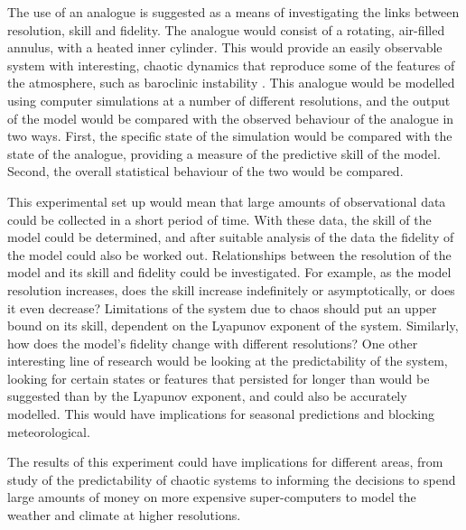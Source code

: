 \documentclass[12pt,a4paper]{article}
\begin{document}
The use of an analogue is suggested as a means of investigating the links between resolution, skill
and fidelity. The analogue would consist of a rotating, air-filled annulus, with a heated inner
cylinder. This would provide an easily observable system with interesting, chaotic dynamics that
reproduce some of the features of the atmosphere, such as baroclinic instability
\cite{castrejon2007baroclinic}. This analogue would be modelled using computer simulations at a
number of different resolutions, and the output of the model would be compared with the observed
behaviour of the analogue in two ways. First, the specific state of the simulation would be compared
with the state of the analogue, providing a measure of the predictive skill of the model. Second,
the overall statistical behaviour of the two would be compared.

This experimental set up would mean that large amounts of observational data could be collected in a
short period of time. With these data, the skill of the model could be determined, and after
suitable analysis of the data the fidelity of the model could also be worked out. Relationships
between the resolution of the model and its skill and fidelity could be investigated. For example,
as the model resolution increases, does the skill increase indefinitely or asymptotically, or does
it even decrease? Limitations of the system due to chaos should put an upper bound on its skill,
dependent on the Lyapunov exponent of the system. Similarly, how does the model's fidelity change
with different resolutions? One other interesting line of research would be looking at the
predictability of the system, looking for certain states or features that persisted for longer than
would be suggested than by the Lyapunov exponent, and could also be accurately modelled. This would
have implications for seasonal predictions and blocking meteorological.

The results of this experiment could have implications for different areas, from study of the
predictability of chaotic systems to informing the decisions to spend large amounts of money on more
expensive super-computers to model the weather and climate at higher resolutions. 

\printbibliography[title={References}]
\end{document}
